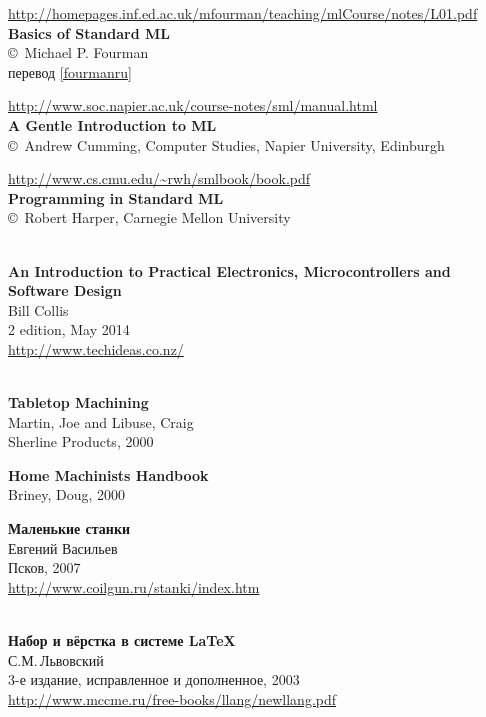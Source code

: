 \begin{thebibliography}{99}
\url{http://homepages.inf.ed.ac.uk/mfourman/teaching/mlCourse/notes/L01.pdf}\\
\textbf{Basics of Standard ML}\\
\copyright\ Michael P. Fourman\\
перевод \ref{fourmanru}

\url{http://www.soc.napier.ac.uk/course-notes/sml/manual.html}\\
\textbf{A Gentle Introduction to ML}\\
\copyright\ Andrew Cumming, Computer Studies, Napier University, Edinburgh

 \url{http://www.cs.cmu.edu/~rwh/smlbook/book.pdf}\\
\textbf{Programming in Standard ML}\\
\copyright\ Robert Harper, Carnegie Mellon University


 \\
\textbf{An Introduction to Practical Electronics, Microcontrollers
and Software Design}\\
Bill Collis\\
2 edition, May 2014\\
\url{http://www.techideas.co.nz/}


 \\
\textbf{Tabletop Machining}\\
Martin, Joe and Libuse, Craig\\
Sherline Products, 2000

\textbf{Home Machinists Handbook}\\
Briney, Doug, 2000

\textbf{Маленькие станки}\\
Евгений Васильев\\
Псков, 2007\\
\url{http://www.coilgun.ru/stanki/index.htm}


\subsecly{\LaTeX}

\ \\
\textbf{Набор и вёрстка в системе \LaTeX}\\
С.М.\,Львовский\\
3-е издание, исправленное и дополненное, 2003\\
\url{http://www.mccme.ru/free-books/llang/newllang.pdf}


\end{thebibliography}
